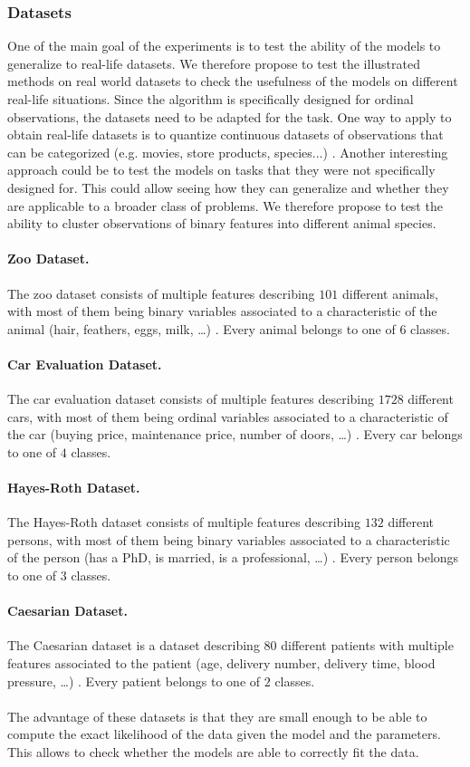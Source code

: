 \subsubsection{Datasets} One of the main goal of the experiments is to test the ability of the models to generalize to real-life datasets. We therefore propose to test the illustrated methods on real world datasets to check the usefulness of the models on different real-life situations. Since the algorithm is specifically designed for ordinal observations, the datasets need to be adapted for the task. One way to apply to obtain real-life datasets is to quantize continuous datasets of observations that can be categorized (e.g. movies, store products, species...) \citep{skubacz2000quantization}. Another interesting approach could be to test the models on tasks that they were not specifically designed for. This could allow seeing how they can generalize and whether they are applicable to a broader class of problems. We therefore propose to test the ability to cluster observations of binary features into different animal species.
\paragraph{Zoo Dataset.} The zoo dataset consists of multiple features describing $101$ different animals, with most of them being binary variables associated to a characteristic of the animal (hair, feathers, eggs, milk, \ldots) \citep{misc_zoo_111}. Every animal belongs to one of $6$ classes. 
\paragraph{Car Evaluation Dataset.} The car evaluation dataset consists of multiple features describing $1728$ different cars, with most of them being ordinal variables associated to a characteristic of the car (buying price, maintenance price, number of doors, \ldots) \citep{misc_car_evaluation_19}. Every car belongs to one of $4$ classes.
\paragraph{Hayes-Roth Dataset.} The Hayes-Roth dataset consists of multiple features describing $132$ different persons, with most of them being binary variables associated to a characteristic of the person (has a PhD, is married, is a professional, \ldots) \citep{misc_hayes_roth_44}. Every person belongs to one of $3$ classes.
\paragraph{Caesarian Dataset.} The Caesarian dataset is a dataset describing $80$ different patients with multiple features associated to the patient (age, delivery number, delivery time, blood pressure, \ldots) \citep{misc_caesarian_section_classification_dataset_472}. Every patient belongs to one of $2$ classes. \\ \\
The advantage of these datasets is that they are small enough to be able to compute the exact likelihood of the data given the model and the parameters. This allows to check whether the models are able to correctly fit the data.
